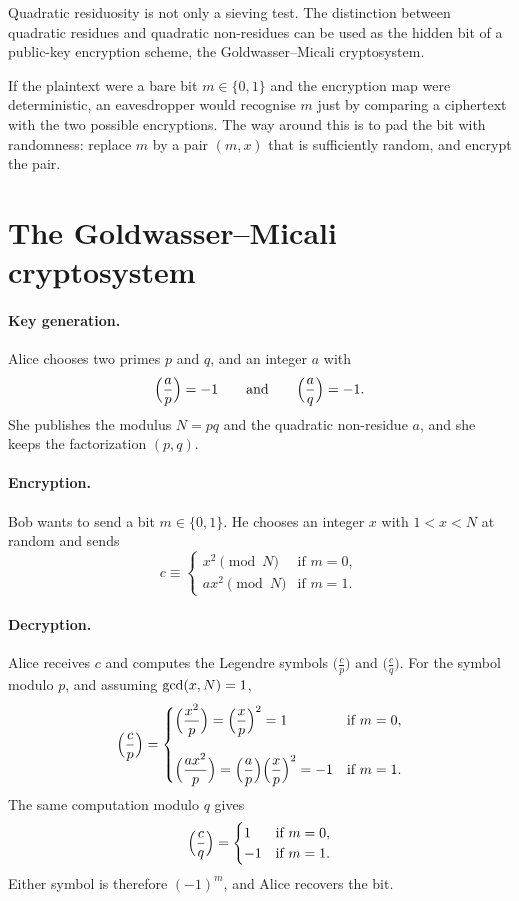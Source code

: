 Quadratic residuosity is not only a sieving test. The distinction between
quadratic residues and quadratic non-residues can be used as the hidden
bit of a public-key encryption scheme, the Goldwasser--Micali cryptosystem.

If the plaintext were a bare bit \(m\in\{0,1\}\) and the encryption map
were deterministic, an eavesdropper would recognise \(m\) just by comparing
a ciphertext with the two possible encryptions. The way around this is to
pad the bit with randomness: replace \(m\) by a pair \((m,x)\) that is
sufficiently random, and encrypt the pair.


\section{The Goldwasser--Micali cryptosystem}
\label{sec:gm}

\paragraph{Key generation.}
Alice chooses two primes \(p\) and \(q\), and an integer \(a\) with
\[
    \Bigl(\frac{a}{p}\Bigr)=-1
    \qquad\text{and}\qquad
    \Bigl(\frac{a}{q}\Bigr)=-1.
\]
She publishes the modulus \(N=pq\) and the quadratic non-residue \(a\), and
she keeps the factorization \((p,q)\).

\paragraph{Encryption.}
Bob wants to send a bit \(m\in\{0,1\}\). He chooses an integer \(x\) with
\(1<x<N\) at random and sends
\[
    c\equiv
    \begin{cases}
        x^{2}\pmod{N} & \text{if }m=0,\\
        ax^{2}\pmod{N} & \text{if }m=1.
    \end{cases}
\]

\paragraph{Decryption.}
Alice receives \(c\) and computes the Legendre symbols
\(\bigl(\frac{c}{p}\bigr)\) and \(\bigl(\frac{c}{q}\bigr)\). For the symbol
modulo \(p\), and assuming \(\operatorname{gcd}(x,N)=1\),
\[
    \Bigl(\frac{c}{p}\Bigr)
    =
    \begin{cases}
        \Bigl(\dfrac{x^{2}}{p}\Bigr)
            =\Bigl(\dfrac{x}{p}\Bigr)^{2}
            =1 & \text{if }m=0,\\[1.6em]
        \Bigl(\dfrac{ax^{2}}{p}\Bigr)
            =\Bigl(\dfrac{a}{p}\Bigr)\Bigl(\dfrac{x}{p}\Bigr)^{2}
            =-1 & \text{if }m=1.
    \end{cases}
\]
The same computation modulo \(q\) gives
\[
    \Bigl(\frac{c}{q}\Bigr)
    =
    \begin{cases}
        1 & \text{if }m=0,\\
        -1 & \text{if }m=1.
    \end{cases}
\]
Either symbol is therefore \((-1)^{m}\), and Alice recovers the bit.

